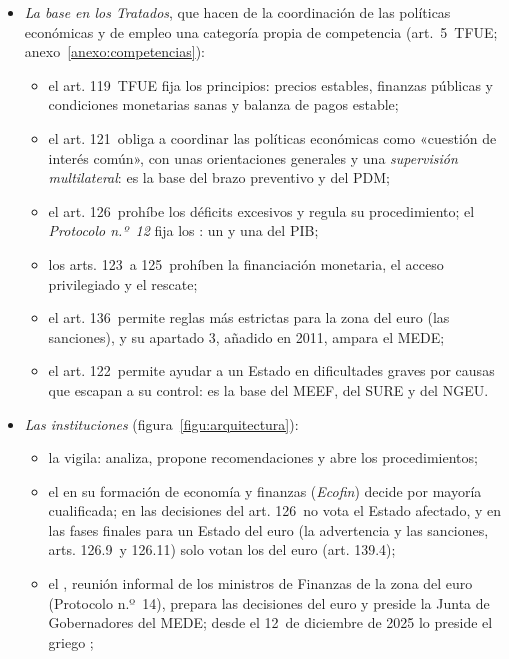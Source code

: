 \documentclass[11pt]{article}
\begin{document}
\begin{itemize}
\item \emph{La base en los Tratados}\nocite{UE2016TFUE}, que hacen de la coordinación de las políticas económicas y de empleo una categoría propia de competencia (art.~5~TFUE; anexo~\ref{anexo:competencias}):
  \begin{itemize}
  \item el art. 119~TFUE fija los principios: precios estables, finanzas públicas y condiciones monetarias sanas y balanza de pagos estable;
  \item el art. 121~obliga a coordinar las políticas económicas como «cuestión de interés común», con unas orientaciones generales y una \emph{supervisión multilateral}: es la base del brazo preventivo y del PDM;
  \item el art. 126~prohíbe los déficits excesivos y regula su procedimiento; el \emph{Protocolo n.º~12} fija los : un  y una  del PIB\nocite{TFUE2012Protocolo12};
  \item los arts. 123~a 125~prohíben la financiación monetaria, el acceso privilegiado y el rescate;
  \item el art. 136~permite reglas más estrictas para la zona del euro (las sanciones), y su apartado 3, añadido en 2011, ampara el MEDE;
  \item el art. 122~permite ayudar a un Estado en dificultades graves por causas que escapan a su control: es la base del MEEF, del SURE y del NGEU.
  \end{itemize}
\item \emph{Las instituciones} (figura~\ref{figu:arquitectura}):
  \begin{itemize}
  \item la  vigila: analiza, propone recomendaciones y abre los procedimientos;
  \item el  en su formación de economía y finanzas (\emph{Ecofin}) decide por mayoría cualificada; en las decisiones del art. 126~no vota el Estado afectado, y en las fases finales para un Estado del euro (la advertencia y las sanciones, arts. 126.9~y 126.11) solo votan los del euro (art. 139.4);
  \item el , reunión informal de los ministros de Finanzas de la zona del euro (Protocolo n.º~14), prepara las decisiones del euro y preside la Junta de Gobernadores del MEDE; desde el 12~de diciembre de 2025 lo preside el griego \nocite{Eurogrupo2025Presidente} ;

\end{itemize}
\end{itemize}
\end{document}
